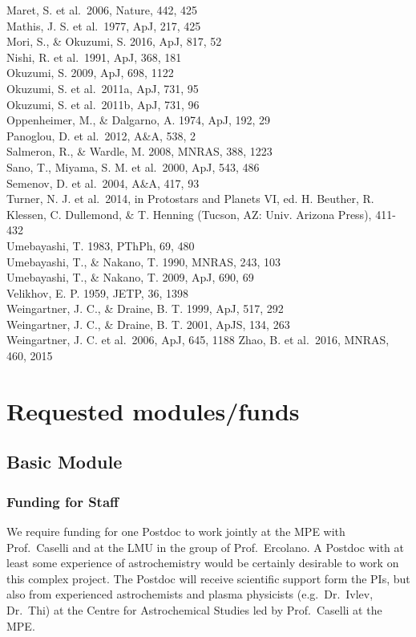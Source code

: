 \documentclass[10pt,fleqn,twoside]{article}
\begin{document}
Maret, S. et al.\ 2006, Nature, 442, 425 \\ 
Mathis, J. S. et al.\ 1977, ApJ, 217, 425 \\
Mori, S., \& Okuzumi, S. 2016, ApJ, 817, 52 \\ 
Nishi, R. et al.\ 1991, ApJ, 368, 181 \\
Okuzumi, S. 2009, ApJ, 698, 1122 \\
Okuzumi, S. et al.\ 2011a, ApJ, 731, 95 \\
Okuzumi, S. et al.\ 2011b, ApJ, 731, 96 \\
Oppenheimer, M., \& Dalgarno, A. 1974, ApJ, 192, 29 \\
Panoglou, D. et al.\ 2012, A\&A, 538, 2 \\
Salmeron, R., \& Wardle, M. 2008, MNRAS, 388, 1223 \\
Sano, T., Miyama, S. M. et al.\ 2000, ApJ, 543, 486 \\
Semenov, D. et al.\ 2004, A\&A, 417, 93 \\
Turner, N. J. et al.\ 2014, in Protostars and Planets VI, ed. H. Beuther, R. Klessen, C. Dullemond, \& T. Henning (Tucson, AZ: Univ. Arizona Press), 411-432 \\
Umebayashi, T. 1983, PThPh, 69, 480 \\
Umebayashi, T., \& Nakano, T. 1990, MNRAS, 243, 103 \\
Umebayashi, T., \& Nakano, T. 2009, ApJ, 690, 69 \\
Velikhov, E. P. 1959, JETP, 36, 1398 \\
Weingartner, J. C., \& Draine, B. T. 1999, ApJ, 517, 292 \\
Weingartner, J. C., \& Draine, B. T. 2001, ApJS, 134, 263 \\
Weingartner, J. C. et al.\ 2006, ApJ, 645, 1188
Zhao, B. et al.\ 2016, MNRAS, 460, 2015\\

\section{Requested modules/funds}
\renewcommand{\leftmark}{\sc  Requested modules/funds}

\subsection{Basic Module}

\subsubsection{Funding for Staff}
We require funding for one Postdoc to work jointly at the MPE with Prof.\ Caselli and at the LMU in the group of
Prof.\ Ercolano.
A Postdoc with at least some experience of astrochemistry would be certainly desirable  to work on this complex  project. The Postdoc will receive scientific support form the PIs, but also from experienced astrochemists and plasma physicists (e.g.\ Dr.\ Ivlev, Dr.\ Thi) at the Centre for Astrochemical Studies led by Prof.\ Caselli at the MPE. 
\end{document}
